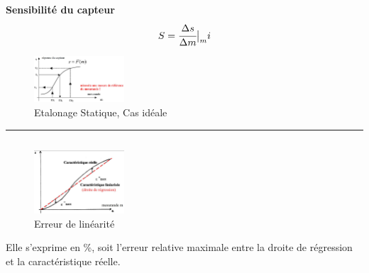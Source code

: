 \documentclass[	DIV=calc,%
							paper=a4,%
							fontsize=11pt,%
							twocolumn]{scrartcl} %
\newcommand{\hformbar}[1]{\vspace{2pt}\hrule\vspace{5pt}} %
\newcommand{\formdesc}[1]{\noindent\textbf{#1}}
\begin{document}
\formdesc{Sensibilité du capteur}
\begin{equation}
    S = \cfrac{\Delta s}{\Delta m} \big |_mi
    \label{Capteur et chaînes d'aquisition}
    \end{equation}
\begin{figure}[H]
    \begin{center}
        \includegraphics[width=0.3\textwidth]{img/Etalonage_statique.JPG}
        \caption{Etalonage Statique, Cas idéale}
        \label{fig:Etalonage Statique, Cas idéale}
    \end{center}
\end{figure}


\hformbar
\formdesc{Erreur de linéarité}
\begin{equation}
    \label{Capteur et chaînes d'aquisition}
    \end{equation}
\begin{figure}[H]
    \begin{center}
        \includegraphics[width=0.3\textwidth]{img/linearite.JPG}
        \caption{Erreur de linéarité}
        \label{fig:Erreur de linéarité}
    \end{center}
\end{figure}
Elle s'exprime en \%, soit l'erreur relative maximale entre la droite de régression et la caractéristique réelle.
\end{document}
